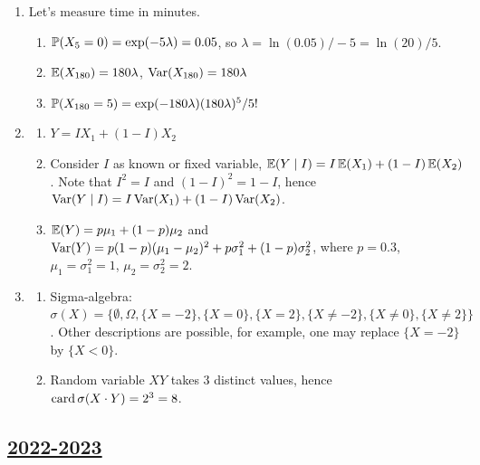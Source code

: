 \begin{enumerate}
    \item 
    Let's measure time in minutes. 
    \begin{enumerate}
      \item $\P(X_5 = 0) = \exp(-5 \lambda) = 0.05$, so $\lambda = \ln (0.05) / -5 = \ln(20) /5$.
      \item $\E(X_{180}) = 180 \lambda$, $\Var(X_{180}) = 180\lambda$
      \item $\P(X_{180} = 5) = \exp(-180 \lambda) (180\lambda)^5/5!$
    \end{enumerate}
  
    \item 
    \begin{enumerate}
      \item $Y = IX_1 + (1-I)X_2$
      \item Consider $I$ as known or fixed variable, $\E(Y \mid I) = I\E(X_1) + (1 - I)\E(X_2)$.
      Note that $I^2 = I$ and $(1-I)^2 = 1-I$, hence $\Var(Y \mid I) = I\Var(X_1) + (1-I)\Var(X_2)$.
      \item $\E(Y) = p \mu_1 + (1-p) \mu_2$ and $\Var(Y) = p(1-p)(\mu_1 - \mu_2)^2 + p\sigma^2_1 + (1-p)\sigma^2_2$,
      where $p = 0.3$, $\mu_1 = \sigma_1^2= 1$, $\mu_2 = \sigma_2^2 =2$.
    \end{enumerate}
  
    \item 
      \begin{enumerate}
       \item 
       Sigma-algebra: $\sigma(X) = \{\emptyset, \Omega, \{X=-2\},  \{X=0\},  \{X=2\},  \{X\neq -2\},  \{X\neq 0\},  \{X\neq 2\}\}$.
       Other descriptions are possible, for example, one may replace $\{X = -2\}$ by $\{X < 0\}$.
       \item Random variable $XY$ takes 3 distinct values, hence $\card \sigma(X \cdot Y) = 2^3 = 8$.
      \end{enumerate}
      
  \end{enumerate}
  


\subsection[2022-2023]{\hyperref[sec:kr_01_2022_2023]{2022-2023}}
\label{sec:sol_kr_01_2022_2023} %

